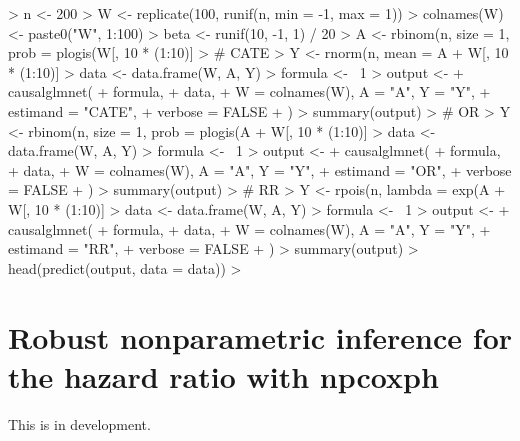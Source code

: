 \documentclass[article]{jss}
\begin{document}
\begin{Schunk}
\begin{Sinput}
> n <- 200
> W <- replicate(100, runif(n, min = -1, max = 1))
> colnames(W) <- paste0("W", 1:100)
> beta <- runif(10, -1, 1) / 20
> A <- rbinom(n, size = 1, prob = plogis(W[, 10 * (1:10)] %*% beta))
> # CATE
> Y <- rnorm(n, mean = A + W[, 10 * (1:10)] %*% beta, sd = 0.5)
> data <- data.frame(W, A, Y)
> formula <- ~1
> output <-
+   causalglmnet(
+     formula,
+     data,
+     W = colnames(W), A = "A", Y = "Y",
+     estimand = "CATE",
+     verbose = FALSE
+   )
> summary(output)
> # OR
> Y <- rbinom(n, size = 1, prob = plogis(A + W[, 10 * (1:10)] %*% beta))
> data <- data.frame(W, A, Y)
> formula <- ~1
> output <-
+   causalglmnet(
+     formula,
+     data,
+     W = colnames(W), A = "A", Y = "Y",
+     estimand = "OR",
+     verbose = FALSE
+   )
> summary(output)
> # RR
> Y <- rpois(n, lambda = exp(A + W[, 10 * (1:10)] %*% beta))
> data <- data.frame(W, A, Y)
> formula <- ~1
> output <-
+   causalglmnet(
+     formula,
+     data,
+     W = colnames(W), A = "A", Y = "Y",
+     estimand = "RR",
+     verbose = FALSE
+   )
> summary(output)
> head(predict(output, data = data))
> 
\end{Sinput}
\end{Schunk}



\section{Robust nonparametric inference for the hazard ratio with npcoxph}
This is in development. \nocite{vanderLaanetal2007}



\end{document}
